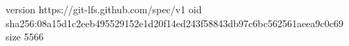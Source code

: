 version https://git-lfs.github.com/spec/v1
oid sha256:08a15d1c2eeb495529152e1d20f14ed243f58843db97c6bc562561aeea9c0c69
size 5566
